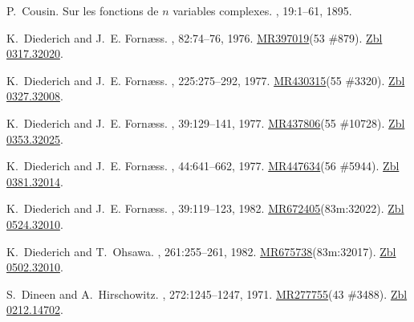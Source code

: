 \documentclass[11pt,a4paper, final, twoside]{article}
\numberwithin{equation}{section}
\begin{document}
\begin{appendices}
\begin{thebibliography}{100}
P.~Cousin.
\newblock Sur les fonctions de $n$ variables complexes.
, 19:1--61, 1895.

K.~Diederich and J.~E. Forn{\ae}ss.
, 82:74--76,
  1976.
\newblock \href{http://www.ams.org/mathscinet-getitem?mr=397019}{MR397019}(53
  \#879). \href{http://zbmath.org/?q=an:0317.32020}{Zbl 0317.32020}.

K.~Diederich and J.~E. Forn{\ae}ss.
, 225:275--292, 1977.
\newblock \href{http://www.ams.org/mathscinet-getitem?mr=430315}{MR430315}(55
  \#3320). \href{http://zbmath.org/?q=an:0327.32008}{Zbl 0327.32008}.

K.~Diederich and J.~E. Forn{\ae}ss.
, 39:129--141, 1977.
\newblock \href{http://www.ams.org/mathscinet-getitem?mr=437806}{MR437806}(55
  \#10728). \href{http://zbmath.org/?q=an:0353.32025}{Zbl 0353.32025}.

K.~Diederich and J.~E. Forn{\ae}ss.
, 44:641--662, 1977.
\newblock \href{http://www.ams.org/mathscinet-getitem?mr=447634}{MR447634}(56
  \#5944). \href{http://zbmath.org/?q=an:0381.32014}{Zbl 0381.32014}.

K.~Diederich and J.~E. Forn{\ae}ss.
, 39:119--123, 1982.
\newblock
  \href{http://www.ams.org/mathscinet-getitem?mr=672405}{MR672405}(83m:32022).
  \href{http://zbmath.org/?q=an:0524.32010}{Zbl 0524.32010}.

K.~Diederich and T.~Ohsawa.
, 261:255--261, 1982.
\newblock
  \href{http://www.ams.org/mathscinet-getitem?mr=675738}{MR675738}(83m:32017).
  \href{http://zbmath.org/?q=an:0502.32010}{Zbl 0502.32010}.

S.~Dineen and A.~Hirschowitz.
, 272:1245--1247, 1971.
\newblock \href{http://www.ams.org/mathscinet-getitem?mr=277755}{MR277755}(43
  \#3488). \href{http://zbmath.org/?q=an:0212.14702}{Zbl 0212.14702}.


\end{thebibliography}
\end{appendices}
\end{document}
